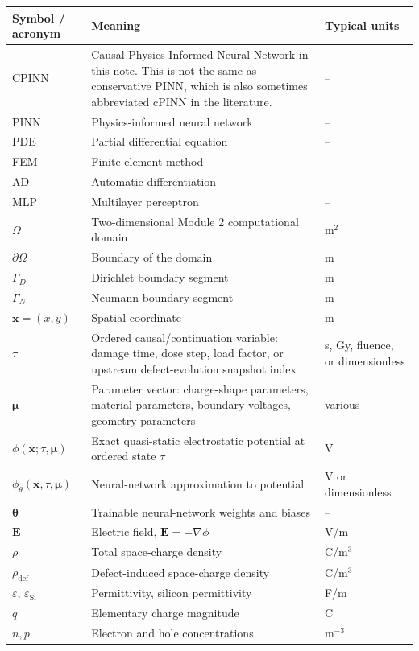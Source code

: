 \documentclass[11pt]{article}
\newcommand{\thetav}{\bm{\theta}}
\newcommand{\xv}{\bm{x}}
\newcommand{\muv}{\bm{\mu}}
\newcommand{\Evec}{\mathbf{E}}
\newcommand{\rhodef}{\rho_{\mathrm{def}}}
\newcommand{\epss}{\varepsilon_{\mathrm{Si}}}
\newcommand{\phinn}{\phi_{\theta}}
\newcommand{\Om}{\Omega}
\newcommand{\taud}{\tau}
\begin{document}
\renewcommand{\arraystretch}{1.25}
\begin{longtable}{p{} p{} p{}}
\toprule
\textbf{Symbol / acronym} & \textbf{Meaning} & \textbf{Typical units} \\
\midrule
\endhead
CPINN & Causal Physics-Informed Neural Network in this note. This is not the same as conservative PINN, which is also sometimes abbreviated cPINN in the literature. & -- \\
PINN & Physics-informed neural network & -- \\
PDE & Partial differential equation & -- \\
FEM & Finite-element method & -- \\
AD & Automatic differentiation & -- \\
MLP & Multilayer perceptron & -- \\
$\Om$ & Two-dimensional Module 2 computational domain & m$^2$ \\
$\partial\Om$ & Boundary of the domain & m \\
$\Gamma_D$ & Dirichlet boundary segment & m \\
$\Gamma_N$ & Neumann boundary segment & m \\
$\xv=(x,y)$ & Spatial coordinate & m \\
$\taud$ & Ordered causal/continuation variable: damage time, dose step, load factor, or upstream defect-evolution snapshot index & s, Gy, fluence, or dimensionless \\
$\muv$ & Parameter vector: charge-shape parameters, material parameters, boundary voltages, geometry parameters & various \\
$\phi(\xv;\taud,\muv)$ & Exact quasi-static electrostatic potential at ordered state $\taud$ & V \\
$\phinn(\xv,\taud,\muv)$ & Neural-network approximation to potential & V or dimensionless \\
$\thetav$ & Trainable neural-network weights and biases & -- \\
$\Evec$ & Electric field, $\Evec=-\nabla\phi$ & V/m \\
$\rho$ & Total space-charge density & C/m$^3$ \\
$\rhodef$ & Defect-induced space-charge density & C/m$^3$ \\
$\varepsilon$, $\epss$ & Permittivity, silicon permittivity & F/m \\
$q$ & Elementary charge magnitude & C \\
$n,p$ & Electron and hole concentrations & m$^{-3}$ \\

\end{longtable}
\end{document}
